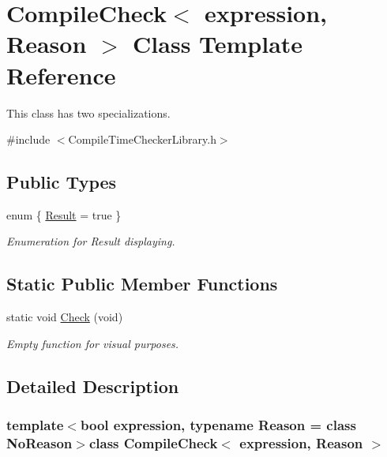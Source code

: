 \hypertarget{class_compile_check}{\section{Compile\-Check$<$ expression, Reason $>$ Class Template Reference}
\label{class_compile_check}
}


This class has two specializations.  




{\ttfamily \#include $<$Compile\-Time\-Checker\-Library.\-h$>$}

\subsection*{Public Types}
\begin{DoxyCompactItemize}
\item 
enum \{ \hyperlink{class_compile_check_a23f09425353e49afb718c608ee4e14eeae1aaa6a952694dd245ce18936fb2b758}{Result} = true
 \}
\begin{DoxyCompactList}\small\item\em Enumeration for Result displaying. \end{DoxyCompactList}\end{DoxyCompactItemize}
\subsection*{Static Public Member Functions}
\begin{DoxyCompactItemize}
\item 
static void \hyperlink{class_compile_check_a0b48338cd3cb0e57b5d5182a1400f847}{Check} (void)
\begin{DoxyCompactList}\small\item\em Empty function for visual purposes. \end{DoxyCompactList}\end{DoxyCompactItemize}


\subsection{Detailed Description}
\subsubsection*{template$<$bool expression, typename Reason = class No\-Reason$>$class Compile\-Check$<$ expression, Reason $>$}

